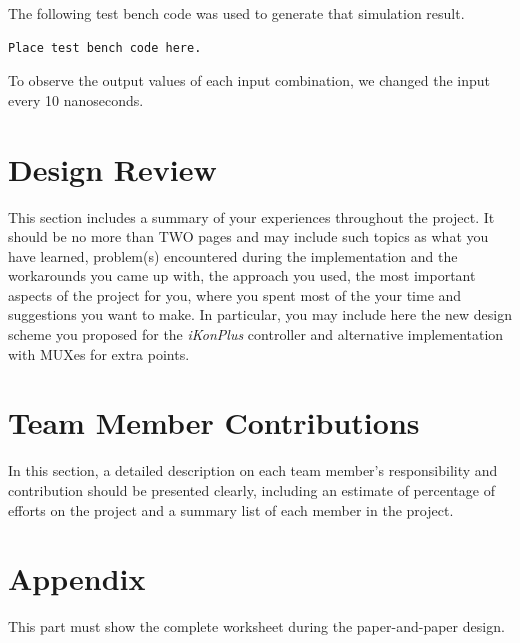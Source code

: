 \documentclass{article}
\begin{document}
The following test bench code was used to generate that simulation result.

\begin{verbatim}
Place test bench code here.
\end{verbatim}

To observe the output values of each input combination, we changed the input 
every 10 nanoseconds.


\section{Design Review}
This section includes a summary of your experiences throughout the project. 
It should be no more than TWO pages and may include such topics as what you 
have learned, problem(s) encountered during the implementation and the 
workarounds you came up with, the approach you used, the most important aspects 
of the project for you, where you spent most of the your time and suggestions 
you want to make. In particular, you may include here the new design scheme 
you proposed for the \textit{iKonPlus} controller and alternative 
implementation with MUXes for extra points.


\section{Team Member Contributions}
In this section, a detailed description on each team member's responsibility 
and contribution should be presented clearly, including an estimate of 
percentage of efforts on the project and a summary list of each member in the 
project.


\section{Appendix}
This part must show the complete worksheet during the paper-and-paper design.
\end{document}
